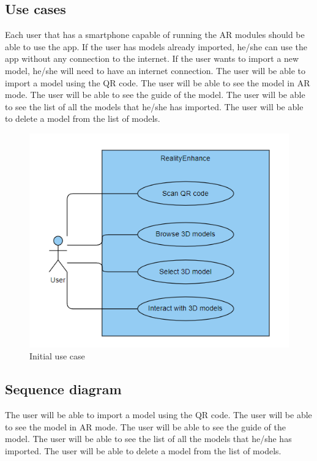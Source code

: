 \subsection*{Use cases}
Each user that has a smartphone capable of running the \ac{AR} modules should be able to use the app. If the user has models already imported, he/she can use the app without any connection to the internet. If the user wants to import a new model, he/she will need to have an internet connection. The user will be able to import a model using the \ac{QR} code. The user will be able to see the model in \ac{AR} mode. The user will be able to see the guide of the model. The user will be able to see the list of all the models that he/she has imported. The user will be able to delete a model from the list of models.

\begin{figure}[ht]
    \centering
    \includegraphics{img/UseCaseDiagram.png}
    \caption{Initial use case}
    \label{fig:InitialUseCase}
\end{figure}

\clearpage

\subsection*{Sequence diagram}
The user will be able to import a model using the \ac{QR} code. The user will be able to see the model in \ac{AR} mode. The user will be able to see the guide of the model. The user will be able to see the list of all the models that he/she has imported. The user will be able to delete a model from the list of models.

